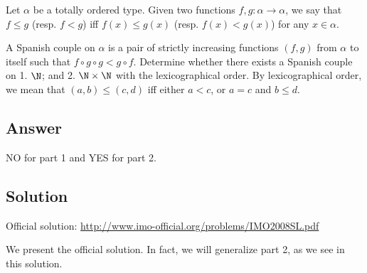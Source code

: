 Let $\alpha$ be a totally ordered type.
Given two functions $f, g : \alpha \to \alpha$, we say that $f \leq g$ (resp. $f < g$) iff $f(x) \leq g(x)$ (resp. $f(x) < g(x)$) for any $x \in \alpha$.

A Spanish couple on $\alpha$ is a pair of strictly increasing functions $(f, g)$ from $\alpha$ to itself such that $f ∘ g ∘ g < g ∘ f$.
Determine whether there exists a Spanish couple on 1. $\N$; and 2. $\N \times \N$ with the lexicographical order.
By lexicographical order, we mean that $(a, b) \leq (c, d)$ iff either $a < c$, or $a = c$ and $b \leq d$.



\subsection*{Answer}

NO for part 1 and YES for part 2.



\subsection*{Solution}

Official solution: \url{http://www.imo-official.org/problems/IMO2008SL.pdf}

We present the official solution.
In fact, we will generalize part 2, as we see in this solution.

